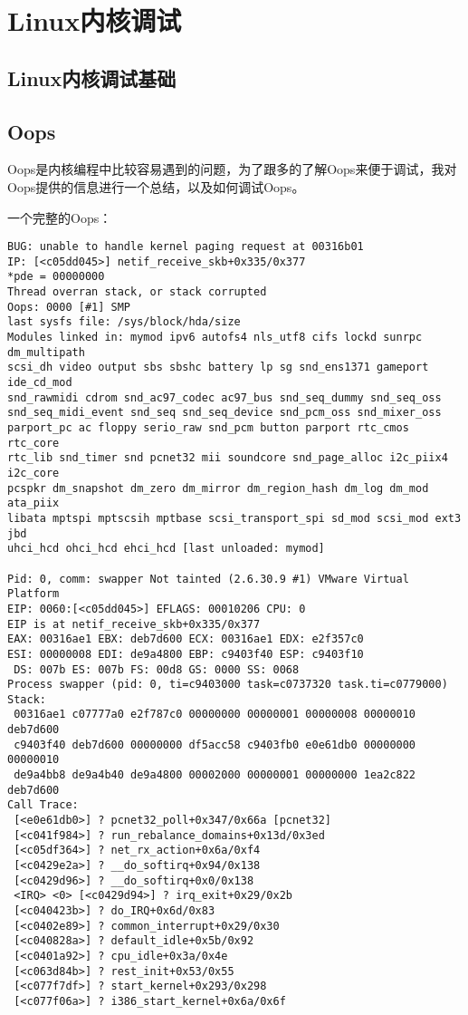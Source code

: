 \chapter{Linux内核调试}

\section{Linux内核调试基础}

\section{Oops}
Oops是内核编程中比较容易遇到的问题，为了跟多的了解Oops来便于调试，我对Oops提供的信息进行一个总结，以及如何调试Oops。


一个完整的Oops：

\begin{lstlisting}
BUG: unable to handle kernel paging request at 00316b01
IP: [<c05dd045>] netif_receive_skb+0x335/0x377
*pde = 00000000
Thread overran stack, or stack corrupted
Oops: 0000 [#1] SMP
last sysfs file: /sys/block/hda/size
Modules linked in: mymod ipv6 autofs4 nls_utf8 cifs lockd sunrpc dm_multipath 
scsi_dh video output sbs sbshc battery lp sg snd_ens1371 gameport ide_cd_mod 
snd_rawmidi cdrom snd_ac97_codec ac97_bus snd_seq_dummy snd_seq_oss 
snd_seq_midi_event snd_seq snd_seq_device snd_pcm_oss snd_mixer_oss 
parport_pc ac floppy serio_raw snd_pcm button parport rtc_cmos rtc_core 
rtc_lib snd_timer snd pcnet32 mii soundcore snd_page_alloc i2c_piix4 i2c_core 
pcspkr dm_snapshot dm_zero dm_mirror dm_region_hash dm_log dm_mod ata_piix 
libata mptspi mptscsih mptbase scsi_transport_spi sd_mod scsi_mod ext3 jbd 
uhci_hcd ohci_hcd ehci_hcd [last unloaded: mymod]

Pid: 0, comm: swapper Not tainted (2.6.30.9 #1) VMware Virtual Platform
EIP: 0060:[<c05dd045>] EFLAGS: 00010206 CPU: 0
EIP is at netif_receive_skb+0x335/0x377
EAX: 00316ae1 EBX: deb7d600 ECX: 00316ae1 EDX: e2f357c0
ESI: 00000008 EDI: de9a4800 EBP: c9403f40 ESP: c9403f10
 DS: 007b ES: 007b FS: 00d8 GS: 0000 SS: 0068
Process swapper (pid: 0, ti=c9403000 task=c0737320 task.ti=c0779000)
Stack:
 00316ae1 c07777a0 e2f787c0 00000000 00000001 00000008 00000010 deb7d600
 c9403f40 deb7d600 00000000 df5acc58 c9403fb0 e0e61db0 00000000 00000010
 de9a4bb8 de9a4b40 de9a4800 00002000 00000001 00000000 1ea2c822 deb7d600
Call Trace:
 [<e0e61db0>] ? pcnet32_poll+0x347/0x66a [pcnet32]
 [<c041f984>] ? run_rebalance_domains+0x13d/0x3ed
 [<c05df364>] ? net_rx_action+0x6a/0xf4
 [<c0429e2a>] ? __do_softirq+0x94/0x138
 [<c0429d96>] ? __do_softirq+0x0/0x138
 <IRQ> <0> [<c0429d94>] ? irq_exit+0x29/0x2b
 [<c040423b>] ? do_IRQ+0x6d/0x83
 [<c0402e89>] ? common_interrupt+0x29/0x30
 [<c040828a>] ? default_idle+0x5b/0x92
 [<c0401a92>] ? cpu_idle+0x3a/0x4e
 [<c063d84b>] ? rest_init+0x53/0x55
 [<c077f7df>] ? start_kernel+0x293/0x298
 [<c077f06a>] ? i386_start_kernel+0x6a/0x6f


\end{lstlisting}
